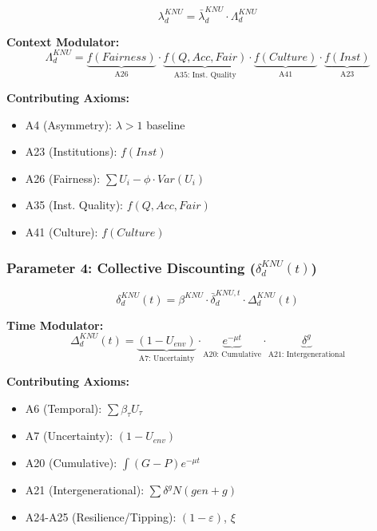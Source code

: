 \begin{tcolorbox}[colback=green!5!white, colframe=green!50!black]
\begin{equation}
\boxed{
\lambda^{KNU}_{d} = \bar{\lambda}^{KNU}_d \cdot \Lambda^{KNU}_d
}
\end{equation}
\end{tcolorbox}

\textbf{Context Modulator:}
\begin{equation}
\Lambda^{KNU}_d = \underbrace{f(Fairness)}_{\text{A26}} \cdot 
                  \underbrace{f(Q, Acc, Fair)}_{\text{A35: Inst. Quality}} \cdot 
                  \underbrace{f(Culture)}_{\text{A41}} \cdot 
                  \underbrace{f(Inst)}_{\text{A23}}
\end{equation}

\textbf{Contributing Axioms:}
\begin{itemize}
\item A4 (Asymmetry): $\lambda > 1$ baseline
\item A23 (Institutions): $f(Inst)$
\item A26 (Fairness): $\sum U_i - \phi \cdot Var(U_i)$
\item A35 (Inst. Quality): $f(Q, Acc, Fair)$
\item A41 (Culture): $f(Culture)$
\end{itemize}

\subsubsection{Parameter 4: Collective Discounting ($\delta^{KNU}_{d}(t)$)}

\begin{tcolorbox}[colback=green!5!white, colframe=green!50!black]
\begin{equation}
\boxed{
\delta^{KNU}_{d}(t) = \beta^{KNU} \cdot \bar{\delta}^{KNU,t}_d \cdot \Delta^{KNU}_d(t)
}
\end{equation}
\end{tcolorbox}

\textbf{Time Modulator:}
\begin{equation}
\Delta^{KNU}_d(t) = \underbrace{(1 - U_{env})}_{\text{A7: Uncertainty}} \cdot 
                    \underbrace{e^{-\mu t}}_{\text{A20: Cumulative}} \cdot 
                    \underbrace{\delta^g}_{\text{A21: Intergenerational}}
\end{equation}

\textbf{Contributing Axioms:}
\begin{itemize}
\item A6 (Temporal): $\sum \beta_\tau U_\tau$
\item A7 (Uncertainty): $(1 - U_{env})$
\item A20 (Cumulative): $\int (G-P) e^{-\mu t}$
\item A21 (Intergenerational): $\sum \delta^g N(gen+g)$
\item A24-A25 (Resilience/Tipping): $(1 - \varepsilon)$, $\xi$
\end{itemize}


